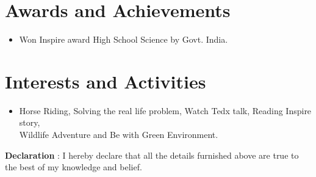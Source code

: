 \documentclass{article}
\begin{document}

\section{Awards and Achievements}
\begin{itemize}
\item Won Inspire award High School Science by Govt. India.
 
\end{itemize}



\section{Interests and Activities}
\begin{itemize}
\item[] Horse Riding, Solving the real life problem,  Watch Tedx talk, Reading Inspire story, \\Wildlife Adventure and Be with Green Environment.\end{itemize}
\vspace*{.5cm}
\textbf{Declaration} : I hereby declare that all the details furnished above are true to the best of my knowledge and belief.
\end{document}
